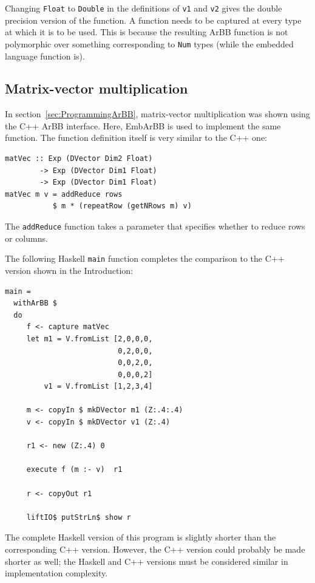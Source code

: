 
Changing {\tt Float} to {\tt Double} in the definitions 
of {\tt v1} and {\tt v2} gives the double precision version of the function.
A function needs to be captured at every type at which it is to be used. This 
is because the resulting ArBB function is not polymorphic over something corresponding 
to {\tt Num} types (while the embedded language function is). 

\subsection{Matrix-vector multiplication} 
In section~\ref{sec:ProgrammingArBB}, matrix-vector multiplication was shown using the C++ ArBB interface. 
Here, EmbArBB is used to implement the same function. The function definition itself 
is very similar to the C++ one:

\begin{verbatim} 
matVec :: Exp (DVector Dim2 Float) 
        -> Exp (DVector Dim1 Float) 
        -> Exp (DVector Dim1 Float) 
matVec m v = addReduce rows 
           $ m * (repeatRow (getNRows m) v)

\end{verbatim} 

The {\tt addReduce} function takes a parameter that specifies whether to reduce 
rows or columns. 


The following Haskell {\tt main} function completes the comparison to the C++ version shown in the Introduction:

\begin{verbatim}
main =  
  withArBB $ 
  do 
     f <- capture matVec  
     let m1 = V.fromList [2,0,0,0,
                          0,2,0,0,
                          0,0,2,0,
                          0,0,0,2]
         v1 = V.fromList [1,2,3,4] 
     
     m <- copyIn $ mkDVector m1 (Z:.4:.4) 
     v <- copyIn $ mkDVector v1 (Z:.4) 

     r1 <- new (Z:.4) 0 

     execute f (m :- v)  r1
              
     r <- copyOut r1
              
     liftIO$ putStrLn$ show r
\end{verbatim}
The complete Haskell version of this program is slightly shorter than the corresponding 
C++ version. However, the C++ version could probably be made shorter as well; the Haskell and C++ versions must be considered similar in implementation complexity. 

